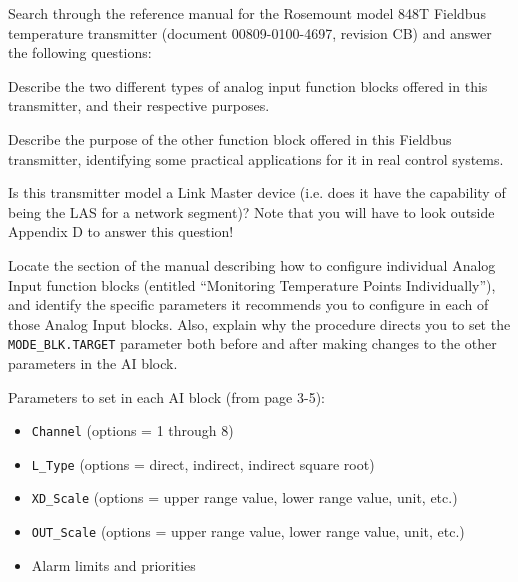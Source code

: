 

Search through the reference manual for the Rosemount model 848T Fieldbus temperature transmitter (document 00809-0100-4697, revision CB) and answer the following questions:

\vskip 10pt

Describe the two different types of analog input function blocks offered in this transmitter, and their respective purposes.

\vskip 10pt

Describe the purpose of the other function block offered in this Fieldbus transmitter, identifying some practical applications for it in real control systems.

\vskip 10pt

Is this transmitter model a Link Master device (i.e. does it have the capability of being the LAS for a network segment)?  Note that you will have to look outside Appendix D to answer this question!

\vskip 10pt

Locate the section of the manual describing how to configure individual Analog Input function blocks (entitled ``Monitoring Temperature Points Individually''), and identify the specific parameters it recommends you to configure in each of those Analog Input blocks.  Also, explain why the procedure directs you to set the {\tt MODE\_BLK.TARGET} parameter both before and after making changes to the other parameters in the AI block.







\noindent
Parameters to set in each AI block (from page 3-5):

\begin{itemize}
\item{} {\tt Channel} (options = 1 through 8)
\item{} {\tt L\_Type} (options = direct, indirect, indirect square root)
\item{} {\tt XD\_Scale} (options = upper range value, lower range value, unit, etc.)
\item{} {\tt OUT\_Scale} (options = upper range value, lower range value, unit, etc.) 
\item{} Alarm limits and priorities
\end{itemize}


